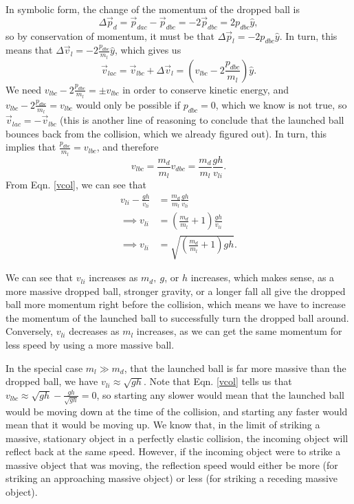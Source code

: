 {In symbolic form, the change of the momentum of the dropped ball is
\[
\Delta \vec{p}_{d} = \vec{p}_{dac}-\vec{p}_{dbc} = -2\vec{p}_{dbc} = 2p_{dbc}\hat{y},
\]
so by conservation of momentum, it must be that $\Delta\vec{p}_{l} = -2p_{dbc}\hat{y}$. In turn, this means that $\Delta\vec{v}_{l} = -2\frac{p_{dbc}}{m_{l}}\hat{y}$, which gives us
\[
\vec{v}_{lac} = \vec{v}_{lbc} + \Delta\vec{v}_{l} = \left(v_{lbc}-2\frac{p_{dbc}}{m_{l}}\right)\hat{y}.
\]
We need $v_{lbc}-2\frac{p_{dbc}}{m_{l}} = \pm v_{lbc}$ in order to conserve kinetic energy, and $v_{lbc}-2\frac{p_{dbc}}{m_{l}} = v_{lbc}$ would only be possible if $p_{dbc}=0$, which we know is not true, so $\vec{v}_{lac}=-\vec{v}_{lbc}$ (this is another line of reasoning to conclude that the launched ball bounces back from the collision, which we already figured out). In turn, this implies that $\frac{p_{dbc}}{m_{l}} = v_{lbc}$, and therefore
\[
v_{lbc} = \frac{m_{d}}{m_{l}}v_{dbc} = \frac{m_{d}}{m_{l}}\frac{gh}{v_{li}}.
\]
From Eqn. \ref{vcol}, we can see that
\[
\begin{split}
	v_{li}-\frac{gh}{v_{li}} & = \frac{m_{d}}{m_{l}}\frac{gh}{v_{li}} \\
	\implies v_{li} & = \left(\frac{m_{d}}{m_{l}}+1\right)\frac{gh}{v_{li}} \\
	\implies v_{li} & = \sqrt{\left(\frac{m_{d}}{m_{l}}+1\right)gh}.
\end{split}
\]

We can see that $v_{li}$ increases as $m_{d},\ g$, or $h$ increases, which makes sense, as a more massive dropped ball, stronger gravity, or a longer fall all give the dropped ball more momentum right before the collision, which means we have to increase the momentum of the launched ball to successfully turn the dropped ball around. Conversely, $v_{li}$ decreases as $m_{l}$ increases, as we can get the same momentum for less speed by using a more massive ball.

In the special case $m_{l}\gg m_{d}$, that the launched ball is far more massive than the dropped ball, we have $v_{li} \approx \sqrt{gh}$. Note that Eqn. \ref{vcol} tells us that $v_{lbc}\approx\sqrt{gh}-\frac{gh}{\sqrt{gh}}=0$, so starting any slower would mean that the launched ball would be moving down at the time of the collision, and starting any faster would mean that it would be moving up. We know that, in the limit of striking a massive, stationary object in a perfectly elastic collision, the incoming object will reflect back at the same speed. However, if the incoming object were to strike a massive object that was moving, the reflection speed would either be more (for striking an approaching massive object) or less (for striking a receding massive object).

}
